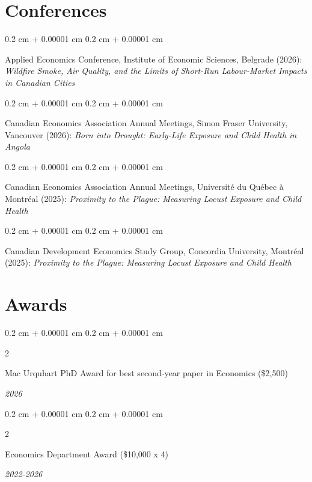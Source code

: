 \documentclass[10pt, letterpaper]{article}
\newenvironment{onecolentry}{
    \begin{adjustwidth}{
        0.2 cm + 0.00001 cm
    }{
        0.2 cm + 0.00001 cm
    }
}{
    \end{adjustwidth}
} %
\newenvironment{twocolentry}[2][]{
    \onecolentry
    \def\secondColumn{#2}
    \setcolumnwidth{\fill, 4.5 cm}
    \begin{paracol}{2}
}{
    \switchcolumn \raggedleft \secondColumn
    \end{paracol}
    \endonecolentry
} %
\begin{document}
\section{Conferences}
\vspace{0.2cm}

\begin{onecolentry}
    Applied Economics Conference, Institute of Economic Sciences, Belgrade (2026):
    \textit{Wildfire Smoke, Air Quality, and the Limits of Short-Run Labour-Market Impacts in Canadian Cities}
\end{onecolentry}
\vspace{0.1cm}

\begin{onecolentry}
    Canadian Economics Association Annual Meetings, Simon Fraser University, Vancouver (2026):
    \textit{Born into Drought: Early-Life Exposure and Child Health in Angola}
\end{onecolentry}
\vspace{0.1cm}

\begin{onecolentry}
    Canadian Economics Association Annual Meetings, Université du Québec à Montréal (2025):
    \textit{Proximity to the Plague: Measuring Locust Exposure and Child Health}
\end{onecolentry}
\vspace{0.1cm}

\begin{onecolentry}
    Canadian Development Economics Study Group, Concordia University, Montréal (2025):
    \textit{Proximity to the Plague: Measuring Locust Exposure and Child Health}
\end{onecolentry}

    \section{Awards}
    \begin{twocolentry}{
        \textit{2026}
        }
            {Mac Urquhart PhD Award for best second-year paper in Economics (\$2,500)}
            
        \end{twocolentry}
        \begin{twocolentry}{
        \textit{2022-2026}
        }
            {Economics Department Award (\$10,000 x 4)}
            
        \end{twocolentry}
        
\end{document}
